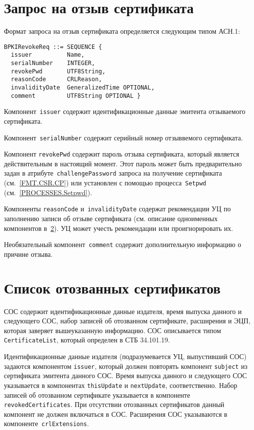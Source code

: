 \section{Запрос на отзыв сертификата}\label{FMT.BPKIRevokeReq}

Формат запроса на отзыв сертификата определяется следующим типом АСН.1:
\begin{verbatim}
BPKIRevokeReq ::= SEQUENCE {
  issuer          Name,
  serialNumber    INTEGER,
  revokePwd       UTF8String,
  reasonCode      CRLReason,
  invalidityDate  GeneralizedTime OPTIONAL,
  comment         UTF8String OPTIONAL }
\end{verbatim}

Компонент~\texttt{issuer} содержит идентификационные данные эмитента 
отзываемого сертификата.

Компонент~\texttt{serialNumber} содержит серийный номер отзыввемого 
сертификата.

Компонент \texttt{revokePwd} содержит пароль отзыва
сертификата, который является действительным в 
настоящий момент. Этот пароль может быть предварительно
задан в атрибуте~\texttt{challengePassword} запроса на получение сертификата 
(см.~\ref{FMT.CSR.CP}) или установлен с помощью процесса~\texttt{Setpwd} 
(см.~\ref{PROCESSES.Setpwd}). 

Компоненты \texttt{reasonCode} и~\texttt{invalidityDate}
содержат рекомендации УЦ по заполнению записи об отзыве сертификата
(см. описание одноименных компонентов в~\ref{FMT.CRL}).
УЦ может учесть рекомендации или проигнорировать их.

Необязательный компонент~\texttt{comment} содержит дополнительную информацию 
о причине отзыва.
 
\section{Список отозванных сертификатов}\label{FMT.CRL}

СОС содержит идентификационные данные издателя, время выпуска данного и 
следующего СОС, набор записей об отозванном сертификате, расширения и ЭЦП, 
которая заверяет вышеуказанную информацию. СОС описывается типом 
\texttt{CertificateList}, который определен в СТБ 34.101.19.
 
Идентификационные данные издателя (подразумевается УЦ, 
выпустивший СОС) задаются компонентом \texttt{issuer}, 
который должен повторять компонент \texttt{subject} из 
сертификата эмитента данного СОС.  
%
Время выпуска данного и следующего СОС указывается в 
компонентах \texttt{thisUpdate} и \texttt{nextUpdate}, 
соответственно.
%
Набор записей об отозванном сертификате указывается в компоненте 
\texttt{revokedCertificates}. При отсутствии отозванных  
сертификатов данный компонент не должен включаться в СОС.
%
Расширения СОС указываются в компоненте~\texttt{crlExtensions}.

